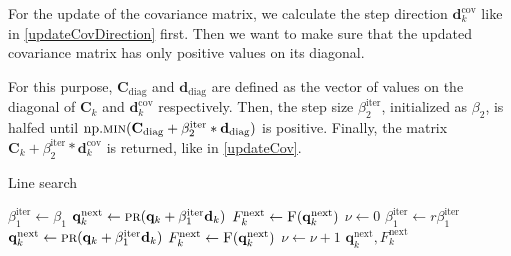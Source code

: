 For the update of the covariance matrix, we calculate the step direction $\mathbf{d}^\mathrm{cov}_k$ like in \ref{updateCovDirection} first. Then we want to make sure that the updated covariance matrix has only positive values on its diagonal.

For this purpose, $\mathbf{C}_\mathrm{diag}$ and $\mathbf{d}_\mathrm{diag}$ are defined as the vector of values on the diagonal of $\mathbf{C}_k$ and $\mathbf{d}^\mathrm{cov}_k$ respectively. Then, the step size $\beta^\mathrm{iter}_2$, initialized as $\beta_2$, is halfed until $\mathrm{np.}\Call{min}{\mathbf{C}_\mathrm{diag}+\beta^\mathrm{iter}_2*\mathbf{d}_\mathrm{diag}}$ is positive. Finally, the matrix $\mathbf{C}_k+\beta^\mathrm{iter}_2*\mathbf{d}^\mathrm{cov}_k$ is returned, like in \eqref{updateCov}.

\begin{algorithm}[H]%
\caption{\label{LineSearchAlg}Line search}
\begin{algorithmic}[1]
\State $\beta^\mathrm{iter}_1 \gets \beta_1$
\State $\mathbf{q}^\mathrm{next}_k \gets \Call{pr}{\mathbf{q}_k+\beta^\mathrm{iter}_1\mathbf{d}_k}$
\State $F^\mathrm{next}_k \gets \Call{F}{\mathbf{q}^\mathrm{next}_k}$
\State $\nu \gets 0$
\State $\beta^\mathrm{iter}_1 \gets r\beta^\mathrm{iter}_1$
\State $\mathbf{q}^\mathrm{next}_k \gets \Call{pr}{\mathbf{q}_k+\beta^\mathrm{iter}_1\mathbf{d}_k}$
\State $F^\mathrm{next}_k \gets \Call{F}{\mathbf{q}^\mathrm{next}_k}$
\State $\nu \gets \nu+1$
\EndWhile
\Return $\mathbf{q}^\mathrm{next}_k, F^\mathrm{next}_k$
\EndFunction
\end{algorithmic}
\end{algorithm}

